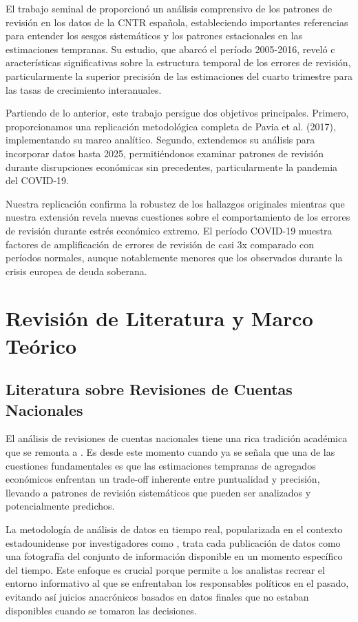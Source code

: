 \documentclass{article}
\begin{document}
El trabajo seminal de \citet{pavia2017} proporcionó un análisis comprensivo de los patrones de revisión en los datos de la CNTR española, estableciendo importantes referencias para entender los sesgos sistemáticos y los patrones estacionales en las estimaciones tempranas. Su estudio, que abarcó el período 2005-2016, reveló c aracterísticas significativas sobre la estructura temporal de los errores de revisión, particularmente la superior precisión de las estimaciones del cuarto trimestre para las tasas de crecimiento interanuales.

Partiendo de lo anterior, este trabajo persigue dos objetivos principales. Primero, proporcionamos una replicación metodológica completa de Pavia et al. (2017), implementando su marco analítico. Segundo, extendemos su análisis para incorporar datos hasta 2025, permitiéndonos examinar patrones de revisión durante disrupciones económicas sin precedentes, particularmente la pandemia del COVID-19.

Nuestra replicación confirma la robustez de los hallazgos originales mientras que nuestra extensión revela nuevas cuestiones sobre el comportamiento de los errores de revisión durante estrés económico extremo. El período COVID-19 muestra factores de amplificación de errores de revisión de casi 3x comparado con períodos normales, aunque notablemente menores que los observados durante la crisis europea de deuda soberana.

\section{Revisión de Literatura y Marco Teórico}

\subsection{Literatura sobre Revisiones de Cuentas Nacionales}

El análisis de revisiones de cuentas nacionales tiene una rica tradición académica que se remonta a \citet{young1993}. Es desde este momento cuando ya se señala que una de las cuestiones fundamentales es que las estimaciones tempranas de agregados económicos enfrentan un trade-off inherente entre puntualidad y precisión, llevando a patrones de revisión sistemáticos que pueden ser analizados y potencialmente predichos.

La metodología de análisis de datos en tiempo real, popularizada en el contexto estadounidense por investigadores como \citet{croushore2001}, trata cada publicación de datos como una fotografía del conjunto de información disponible en un momento específico del tiempo. Este enfoque es crucial porque permite a los analistas recrear el entorno informativo al que se enfrentaban los responsables políticos en el pasado, evitando así juicios anacrónicos basados en datos finales que no estaban disponibles cuando se tomaron las decisiones.
\end{document}
